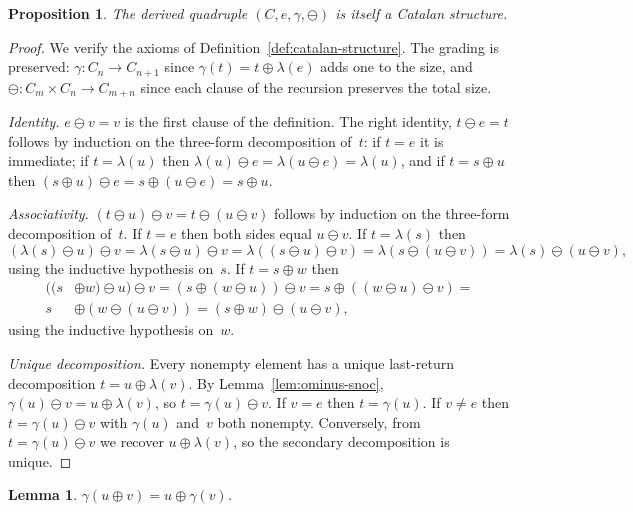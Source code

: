 \documentclass[a4paper,11pt]{article}
\newtheorem{lemma}[theorem]{Lemma}
\newtheorem{proposition}[theorem]{Proposition}
\theoremstyle{definition}
\begin{document}
\begin{proposition}\label{prop:secondary-catalan}
The derived quadruple $(C,e,\gamma,\ominus)$ is itself a
Catalan structure.
\end{proposition}

\begin{proof}
We verify the axioms of
Definition~\ref{def:catalan-structure}.
The grading is preserved: $\gamma\colon C_n \to C_{n+1}$
since $\gamma(t) = t \oplus \lambda(e)$ adds one to the
size, and $\ominus\colon C_m \times C_n \to C_{m+n}$
since each clause of the recursion preserves the total
size.

\emph{Identity.} $e \ominus v = v$ is the first clause
of the definition. The right identity,
$t \ominus e = t$ follows by induction on the
three-form decomposition of~$t$: if $t = e$ it is
immediate; if $t = \lambda(u)$ then
$\lambda(u) \ominus e = \lambda(u \ominus e)
= \lambda(u)$, and if $t = s \oplus u$ then
$(s \oplus u) \ominus e = s \oplus (u \ominus e)
= s \oplus u$.

\emph{Associativity.}
$(t \ominus u) \ominus v = t \ominus (u \ominus v)$
follows by induction on the three-form decomposition
of~$t$. If $t = e$ then both sides equal
$u \ominus v$. If $t = \lambda(s)$ then
\[
(\lambda(s) \ominus u) \ominus v
  = \lambda(s \ominus u) \ominus v
  = \lambda((s \ominus u) \ominus v)
  = \lambda(s \ominus (u \ominus v))
  = \lambda(s) \ominus (u \ominus v),
\]
using the inductive hypothesis on~$s$. If
$t = s \oplus w$ then
\begin{align*}
((s &\oplus w) \ominus u) \ominus v
  = (s \oplus (w \ominus u)) \ominus v
  = s \oplus ((w \ominus u) \ominus v)=\\
  s &\oplus (w \ominus (u \ominus v))
  = (s \oplus w) \ominus (u \ominus v),
\end{align*}
using the inductive hypothesis on~$w$.

\emph{Unique decomposition.} Every nonempty element
has a unique last-return decomposition
$t = u \oplus \lambda(v)$. By
Lemma~\ref{lem:ominus-snoc},
$\gamma(u) \ominus v = u \oplus \lambda(v)$, so
$t = \gamma(u) \ominus v$. If $v = e$ then
$t = \gamma(u)$. If $v \neq e$ then
$t = \gamma(u) \ominus v$ with $\gamma(u)$ and~$v$
both nonempty. Conversely, from
$t = \gamma(u) \ominus v$ we recover
$u \oplus \lambda(v)$, so the secondary decomposition
is unique.
\end{proof}

\begin{lemma}\label{lem:gamma-oplus}
$\gamma(u \oplus v) = u \oplus \gamma(v)$.
\end{lemma}
\end{document}
